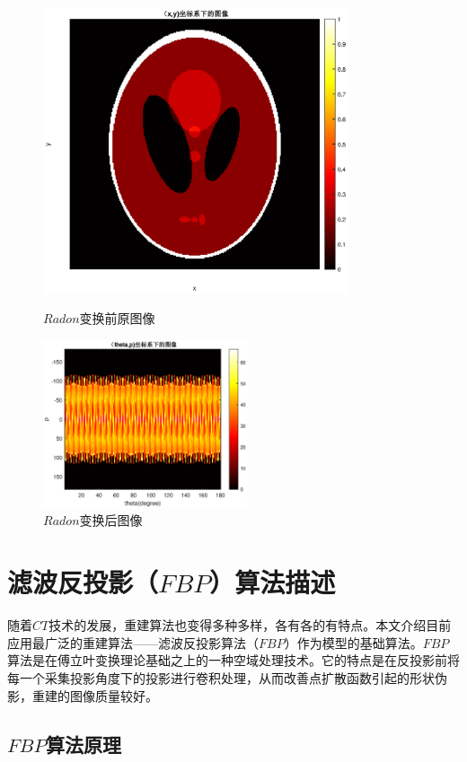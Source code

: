 \documentclass[hyperref]{ctexart}
\begin{document}
			\begin{figure}
			  \begin{minipage}[b]{0.5\linewidth}
			    \centering
			    \includegraphics[width=90mm]{Radon_Origin.eps}
			    \caption{$Radon$变换前原图像}
			    \label{fig:a}
			  \end{minipage}%
			  \begin{minipage}[b]{0.5\linewidth}
			    \centering
			    \includegraphics[width=60mm]{Radon_full_dose.eps}
			    \caption{$Radon$变换后图像}
			    \label{fig:b}
			  \end{minipage}
			\end{figure}
	
	\section{滤波反投影（$FBP$）算法描述}
		随着$CT$技术的发展，重建算法也变得多种多样，各有各的有特点。本文介绍目前应用最广泛的重建算法——滤波反投影算法（$FBP$）作为模型的基础算法。$FBP$算法是在傅立叶变换理论基础之上的一种空域处理技术。它的特点是在反投影前将每一个采集投影角度下的投影进行卷积处理，从而改善点扩散函数引起的形状伪影，重建的图像质量较好。

		\subsection{$FBP$算法原理}
\end{document}
